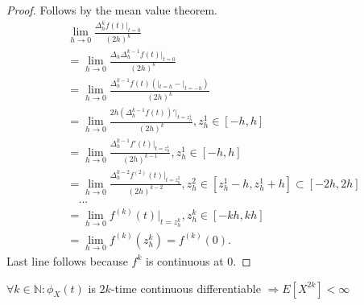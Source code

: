 \documentclass[a4paper,11pt]{article}
\begin{document}
\begin{proof}
    Follows by the mean value theorem.
    \begin{align}
         & \lim_{h \to 0} \frac{\Delta^{k}_{h} f(t)|_{t=0}}{(2h)^{k}}                                                                              \\
         & = \lim_{h \to 0} \frac{\Delta_{h}\Delta^{k-1}_{h} f(t)|_{t=0}}{(2h)^{k}}                                                                \\
         & = \lim_{h \to 0} \frac{\Delta^{k-1}_{h} f(t)(|_{t=h}-|_{t=-h})}{(2h)^{k}}                                                               \\
         & = \lim_{h \to 0} \frac{2h (\Delta^{k-1}_{h} f(t))'|_{t=z^{1}_{h}}}{(2h)^{k}}, z^{1}_{h} \in[-h,h]                                       \\
         & = \lim_{h \to 0} \frac{\Delta^{k-1}_{h} f'(t)|_{t=z^{1}_{h}}}{(2h)^{k-1}}, z^{1}_{h} \in[-h,h]                                          \\
         & = \lim_{h \to 0} \frac{\Delta^{k-2}_{h} f^{(2)}(t)|_{t=z^{2}_{h}}}{(2h)^{k-2}}, z^{2}_{h} \in[z^{1}_{h}-h,z^{1}_{h}+h] \subset [-2h,2h] \\
         & \quad ...                                                                                                                               \\
         & = \lim_{h \to 0} f^{(k)}(t)|_{t=z^{k}_{h}},  z^{k}_{h} \in [-k h, k h]                                                                  \\
         & = \lim_{h \to 0} f^{(k)}(z^{k}_{h}) = f^{(k)}(0).
    \end{align}
    Last line follows because $f^{k}$ is continuous at $0$.
\end{proof}


\begin{lemma} \label{lemma:moment_smooth_char}
    $\forall k \in  \mathbb{N}:\phi_{X}(t)$ is $2k$-time continuous differentiable $\Rightarrow  E[X^{2k}] < \infty$
\end{lemma}
\end{document}
